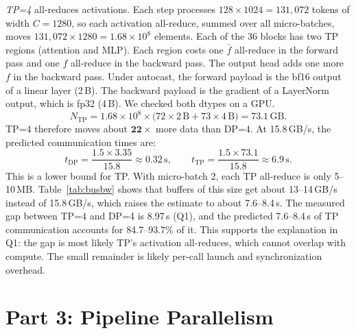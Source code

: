 \documentclass[10pt]{article}
\begin{document}
\emph{TP=4} all-reduces activations. Each step processes
$128 \times 1024 = 131{,}072$ tokens of width $C = 1280$, so each
activation all-reduce, summed over all micro-batches, moves
$131{,}072 \times 1280 = 1.68\times10^{8}$ elements. Each of the 36
blocks has two TP regions (attention and MLP). Each region costs one
$\bar f$ all-reduce in the forward pass and one $f$ all-reduce in the
backward pass. The output head adds one more $f$ in the backward pass.
Under autocast, the forward payload is the bf16 output of a linear layer
(2\,B). The backward payload is the gradient of a LayerNorm output, which
is fp32 (4\,B). We checked both dtypes on a GPU.
\[
N_\text{TP} = 1.68\times10^{8}\times\bigl(72 \times 2\,\text{B} + 73 \times 4\,\text{B}\bigr)
  = 73.1\,\text{GB}.
\]
TP=4 therefore moves about $\mathbf{22\times}$ more data than DP=4. At
15.8\,GB/s, the predicted communication times are:
\[
t_\text{DP} = \frac{1.5 \times 3.35}{15.8} \approx 0.32\,\text{s},
\qquad
t_\text{TP} = \frac{1.5 \times 73.1}{15.8} \approx 6.9\,\text{s}.
\]
This is a lower bound for TP. With micro-batch 2, each TP all-reduce is
only 5--10\,MB. Table~\ref{tab:busbw} shows that buffers of this size get
about 13--14\,GB/s instead of 15.8\,GB/s, which raises the estimate to
about 7.6--8.4\,s.
The measured gap between TP=4 and DP=4 is 8.97\,s (Q1), and the predicted
7.6--8.4\,s of TP communication accounts for 84.7--93.7\% of it. This
supports the explanation in Q1: the gap is most likely TP's activation
all-reduces, which cannot overlap with compute. The small remainder is
likely per-call launch and synchronization overhead.

\section{Part 3: Pipeline Parallelism}
\end{document}
